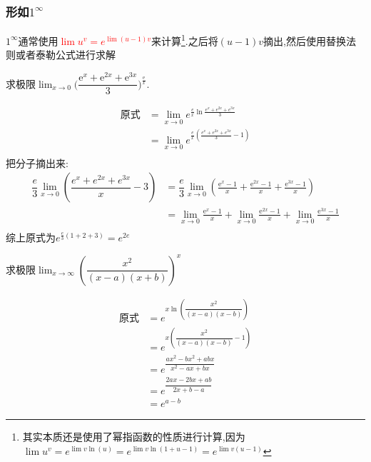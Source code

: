 \documentclass[8pt a4paper, oneside, UTF8]{ctexbook}
\begin{document}
\begin{sloppypar}
    \subsubsection{形如$1^{\infty}$}
         $1 ^ \infty$通常使用\textcolor{red}{$\lim u^v=e^{\lim (u-1)v}$}来计算\footnote{其实本质还是使用了幂指函数的性质进行计算,因为$\lim u^v=e^{\lim v\ln(u)}=e^{\lim v \ln(1 + u -1)}=e^{\lim v (u-1)}$}.之后将$(u-1)v$摘出,然后使用替换法则或者泰勒公式进行求解
        \begin{problem}
            求极限$\lim_{x\to0}\Bigg(\dfrac{\mathrm{e}^x+\mathrm{e}^{2x}+\mathrm{e}^{3x}}3\Bigg)^{\frac{\mathrm{e}}{x}}.$
        \end{problem}
        \begin{solution}
            \begin{align*}
              \text{原式} & = \lim_{x\to0} e^{\frac{e}{x} \ln \frac{e^x+e^{2x}+e^{3x}}{3}}\\
              & = \lim_{x\to0} e^{\frac{e}{x}(\frac{e^x+e^{2x}+e^{3x}}{3}-1)}\\
            \end{align*}
        把分子摘出来:
        \begin{align*}
          \dfrac{e}{3} \lim_{x\to 0}(\dfrac{e^x+e^{2x}+e^{3x}}{x} -3) & =\dfrac{e}{3} \lim_{x\to 0} (\frac{\mathrm{e}^x-1}x+\frac{\mathrm{e}^{2x}-1}x+\frac{\mathrm{e}^{3x}-1}x)\\
          & = \lim_{x\to0}\frac{\mathrm{e}^{x}-1}{x}+\lim_{x\to0}\frac{\mathrm{e}^{2x}-1}{x}+\lim_{x\to0}\frac{\mathrm{e}^{3x}-1}{x}\\
        \end{align*}
        综上原式为$e^{\frac{e}{3}(1+2+3)}=e^{2e}$
        \end{solution}
        \begin{problem}
            求极限$\lim_{x\to\infty}(\dfrac{x^2}{(x-a)(x+b)})^x$
        \end{problem}
        \begin{solution}
            \begin{align*}
              \text{原式} & =e^{x \ln (\dfrac{x^2}{(x-a)(x-b)})}\\
              & =e^{x(\dfrac{x^2}{(x-a)(x-b)}-1)}\\
              & = e^{\dfrac{ax^2-bx^2+abx}{x^2-ax+bx}}\\
              & = e^{\dfrac{2ax-2bx+ab}{2x+b-a}}\\
              & = e^{a-b}
            \end{align*}

\end{solution}
\end{sloppypar}
\end{document}

